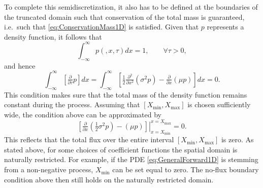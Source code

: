 \documentclass[10pt]{article}
\begin{document}
To complete this semidiscretization, it also has to be defined at the boundaries of the truncated domain such that conservation of the total mass is guaranteed, i.e.\ such that \eqref{eq:ConservationMass1D} is satisfied.
Given that $p$ represents a density function, it follows that
$$ \int_{-\infty}^{\infty} p(,x,\tau) dx = 1, \qquad \forall \tau > 0,$$
and hence
$$ \int_{-\infty}^{\infty} \left[ \tfrac{\partial}{\partial \tau} p \right] dx = \int_{-\infty}^{\infty} \left[ \tfrac{1}{2} \tfrac{\partial^{2}}{\partial x^{2}} \left( \sigma^{2}p \right) - \tfrac{\partial}{\partial x} \left( \mu p \right) \right] dx = 0. $$
This condition makes sure that the total mass of the density function remains constant during the process. 
Assuming that $[X_{\min},X_{\max}]$ is chosen sufficiently wide, the condition above can be approximated by
$$ \left. \left[ \tfrac{\partial}{\partial x} \left( \tfrac{1}{2} \sigma^{2}p \right) - \left( \mu p \right) \right]\right\vert^{x= X_{\max}}_{x=X_{\min}} = 0. $$
This reflects that the total flux over the entire interval $[X_{\min},X_{\max}]$ is zero. 
As stated above, for some choices of coefficient functions the spatial domain is naturally restricted. For example, if the PDE \eqref{eq:GeneralForward1D} is stemming from a non-negative process, $X_{\min}$ can be set equal to zero. The no-flux boundary condition above then still holds on the naturally restricted domain.
\end{document}
